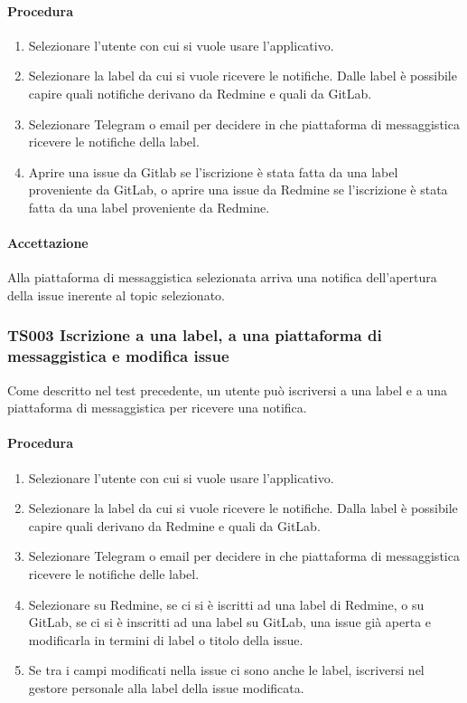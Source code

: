 		\paragraph*{Procedura}
			\begin{enumerate}
				\item Selezionare l'utente con cui si vuole usare l'applicativo.
				\item Selezionare la label da cui si vuole ricevere le notifiche. Dalle label è possibile capire quali notifiche derivano da Redmine e quali da GitLab.
				\item Selezionare Telegram o email per decidere in che piattaforma di messaggistica ricevere le notifiche della label.
				\item Aprire una issue da Gitlab se l'iscrizione è stata fatta da una label proveniente da GitLab, o aprire una issue da Redmine se l'iscrizione è stata fatta da una label proveniente da Redmine.
			\end{enumerate}
		
		\paragraph*{Accettazione}
		Alla piattaforma di messaggistica selezionata arriva una notifica dell'apertura della issue inerente al topic selezionato.
		
	\subsubsection{TS003 Iscrizione a una label, a una piattaforma di messaggistica e modifica issue}
		Come descritto nel test precedente, un utente può iscriversi a una label e a una piattaforma di messaggistica per ricevere una notifica.
		
		\paragraph*{Procedura}
			\begin{enumerate}
				\item Selezionare l'utente con cui si vuole usare l'applicativo.
				\item Selezionare la label da cui si vuole ricevere le notifiche. Dalla label è possibile capire quali derivano da Redmine e quali da GitLab.
				\item Selezionare Telegram o email per decidere in che piattaforma di messaggistica ricevere le notifiche delle label.
				\item Selezionare su Redmine, se ci si è iscritti ad una label di Redmine, o su GitLab, se ci si è inscritti ad una label su GitLab, una issue già aperta e modificarla in termini di label o titolo della issue.
				\item Se tra i campi modificati nella issue ci sono anche le label, iscriversi nel gestore personale alla label della issue modificata.
			\end{enumerate}
		
